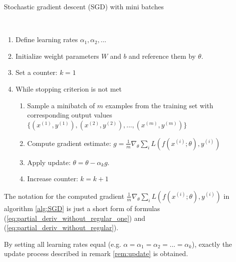 \begin{algorithm}
	\caption{Stochastic gradient descent (SGD) with mini batches \cite{goodfellow2016deep}}\label{alg:SGD}
	\begin{algorithmic}
		\\
		\begin{enumerate}
			\item Define learning rates $\alpha_1, \alpha_2, ...$
			\item Initialize weight parameters $W$ and $b$ and reference them by $\theta$.
			\item Set a counter: $k = 1$
			\item While stopping criterion is not met
			\begin{enumerate}[label=\emph{\alph*})]
				\item Sample a minibatch of $m$ examples from the training set with corresponding output values
				$\{(x^{(1)}, y^{(1)}), (x^{(2)}, y^{(2)}), ..., (x^{(m)}, y^{(m)})\}$
				\item Compute gradient estimate: $g = \frac{1}{m} \nabla_\theta \sum_i L(f(x^{(i)};\theta), y^{(i)})$
				\item Apply update: $\theta = \theta - \alpha_k g$.
				\item Increase counter: $k = k + 1$
			\end{enumerate}
		\end{enumerate}
	\end{algorithmic}
\end{algorithm}

\begin{remark}
	The notation for the computed gradient $\frac{1}{m} \nabla_\theta \sum_i L(f(x^{(i)};\theta), y^{(i)})$ in algorithm \ref{alg:SGD} is just a short form of formulas (\ref{eq:partial_deriv_without_regular_one}) and (\ref{eq:partial_deriv_without_regular}).
\end{remark}

\begin{remark}
	By setting all learning rates equal (e.g. $\alpha = \alpha_1 = \alpha_2 = ... = \alpha_k$), exactly the update process described in remark \ref{rem:update} is obtained.
\end{remark}


